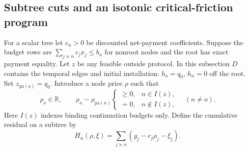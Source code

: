 \subsection{Subtree cuts and an isotonic critical-friction program}
For a scalar tree let $c_n>0$ be discounted net-payment coefficients. Suppose the budget rows are $\sum_{j\succeq n}c_jx_j\leq b_n$ for nonroot nodes and the root has exact payment equality. Let $z$ be any feasible outside protocol. In this subsection $D$ contains the temporal edges and initial installation: $h_o=q_0$, $h_n=0$ off the root. Set $z_{\mathrm{pa}(o)}=q_0$. Introduce a node price $\rho$ such that
\begin{equation}\label{eq:r12-isotonic}
 \rho_o\in\mathbb R,\qquad
 \rho_n-\rho_{\mathrm{pa}(n)}\begin{cases}\geq0,& n\in I(z),\\=0,& n\notin I(z),\end{cases}
 \quad(n\ne o).
\end{equation}
Here $I(z)$ indexes binding continuation budgets only. Define the cumulative residual on a subtree by
\begin{equation}\label{eq:r12-cut}
 H_n(\rho,\xi)=\sum_{j\succeq n}(g_j-c_j\rho_j-\xi_j).
\end{equation}

